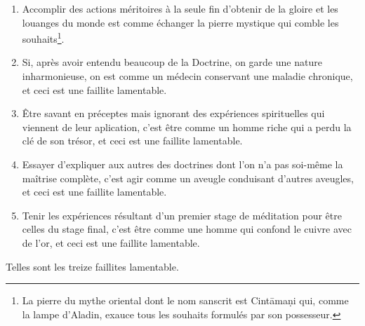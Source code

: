 \documentclass[10pt]{book}
\begin{document}
\begin{enumerate}[1.-]
\item Accomplir des actions méritoires à la seule fin d'obtenir de la gloire et les louanges du monde est comme échanger la pierre mystique qui comble les souhaits\footnote{La pierre du mythe oriental dont le nom sanscrit est Cintāmaṇi qui, comme la lampe d'Aladin, exauce tous les souhaits formulés par son possesseur.}.
\item Si, après avoir entendu beaucoup de la Doctrine, on garde une nature inharmonieuse, on est comme un médecin conservant une maladie chronique, et ceci est une faillite lamentable.
\item Être savant en préceptes mais ignorant des expériences spirituelles qui viennent de leur aplication, c'est être comme un homme riche qui a perdu la clé de son trésor, et ceci est une faillite lamentable.
\item Essayer d'expliquer aux autres des doctrines dont l'on n'a pas soi-même la maîtrise complète, c'est agir comme un aveugle conduisant d'autres aveugles, et ceci est une faillite lamentable.
\item Tenir les expériences résultant d'un premier stage de méditation pour être celles du stage final, c'est être comme une homme qui confond le cuivre avec de l'or, et ceci est une faillite lamentable.
\end{enumerate}
Telles sont les treize faillites lamentable.
\end{document}
